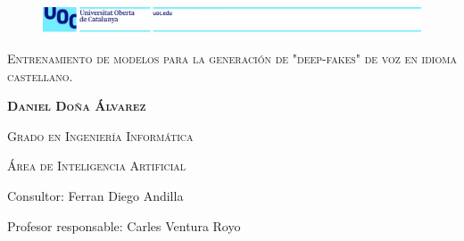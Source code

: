 \thispagestyle{empty}

\begin{figure}[ht]
\includegraphics[width=19cm]{img/head.jpg}
\end{figure}

\vspace{3cm}

\begin{center}
{\scshape\Large {Entrenamiento de modelos para la generación de "deep-fakes" de voz en idioma castellano.} \par}

{\scshape\Large \textbf{Daniel Doña Álvarez} \par}
\vspace{2cm}
{\scshape\large Grado en Ingeniería Informática \par}
{\scshape\large Área de Inteligencia Artificial \par}




\end{center}

\vspace*{\fill}

\begin{flushleft}

Consultor: Ferran Diego Andilla

Profesor responsable: Carles Ventura Royo

\end{flushleft}